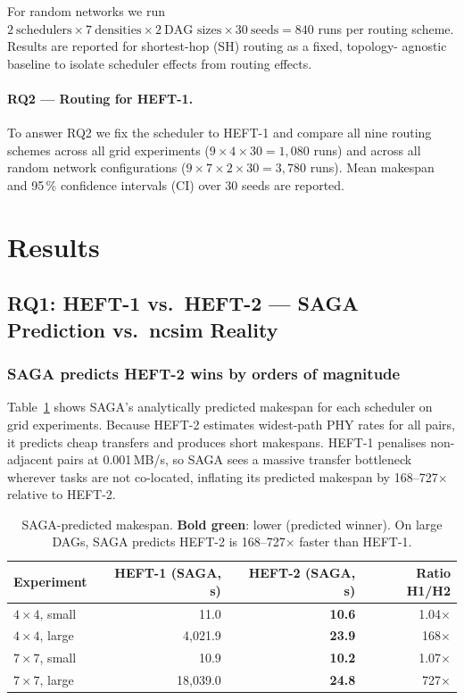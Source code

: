 \documentclass[11pt]{article}
\newcommand{\win}[1]{\textcolor{green!50!black}{\textbf{#1}}}
\begin{document}
For random networks we run $2\ \text{schedulers} \times 7\ \text{densities}
\times 2\ \text{DAG sizes} \times 30\ \text{seeds} = 840$ runs per routing
scheme.  Results are reported for shortest-hop (SH) routing as a fixed, topology-
agnostic baseline to isolate scheduler effects from routing effects.

\paragraph{RQ2 --- Routing for HEFT-1.}
To answer RQ2 we fix the scheduler to HEFT-1 and compare all nine routing
schemes across all grid experiments ($9 \times 4 \times 30 = 1{,}080$ runs)
and across all random network configurations ($9 \times 7 \times 2 \times 30 = 3{,}780$
runs).  Mean makespan and 95\,\% confidence intervals (CI) over 30 seeds are
reported.

\section{Results}
\label{sec:results}

\subsection{RQ1: HEFT-1 vs.\ HEFT-2 --- SAGA Prediction vs.\ ncsim Reality}

\subsubsection{SAGA predicts HEFT-2 wins by orders of magnitude}

Table~\ref{tab:saga-predictions} shows SAGA's analytically predicted makespan
for each scheduler on grid experiments.  Because HEFT-2 estimates widest-path
PHY rates for all pairs, it predicts cheap transfers and produces short makespans.
HEFT-1 penalises non-adjacent pairs at 0.001\,MB/s, so SAGA sees a massive
transfer bottleneck wherever tasks are not co-located, inflating its predicted
makespan by 168--727$\times$ relative to HEFT-2.

\begin{table}[H]
\centering
\small
\begin{tabular}{l r r r}
\toprule
\textbf{Experiment} & \textbf{HEFT-1 (SAGA, s)} & \textbf{HEFT-2 (SAGA, s)} & \textbf{Ratio H1/H2} \\
\midrule
$4\times4$, small & 11.0  & \win{10.6}  & 1.04$\times$ \\
$4\times4$, large & 4{,}021.9 & \win{23.9}  & 168$\times$ \\
$7\times7$, small & 10.9  & \win{10.2}  & 1.07$\times$ \\
$7\times7$, large & 18{,}039.0 & \win{24.8} & 727$\times$ \\
\bottomrule
\end{tabular}
\caption{SAGA-predicted makespan.  \win{Bold green}: lower (predicted winner).
On large DAGs, SAGA predicts HEFT-2 is 168--727$\times$ faster than HEFT-1.}
\label{tab:saga-predictions}
\end{table}
\end{document}
